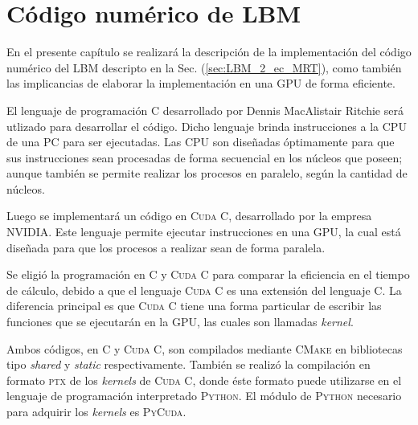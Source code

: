 \chapter{Código numérico de LBM}
\graphicspath{{figs/cap3/}}
\label{cap3}




En el presente capítulo se realizará la descripción de la implementación del código numérico del LBM descripto en la Sec. (\ref{sec:LBM_2_ec_MRT}), como también las implicancias de elaborar la implementación en una GPU de forma eficiente.

El lenguaje de programación \textsc{C} desarrollado por Dennis MacAlistair Ritchie será utlizado para desarrollar el código. Dicho lenguaje brinda instrucciones a la CPU de una PC para ser ejecutadas. Las CPU son diseñadas óptimamente para que sus instrucciones sean procesadas de forma secuencial en los núcleos que poseen; aunque también se permite realizar los procesos en paralelo, según la cantidad de núcleos.

Luego se implementará un código en \textsc{Cuda C}, desarrollado por la empresa NVIDIA. Este lenguaje permite ejecutar instrucciones en una GPU, la cual está diseñada para que los procesos a realizar sean de forma paralela.

Se eligió la programación en \textsc{C} y \textsc{Cuda C} para comparar la eficiencia en el tiempo de cálculo, debido a que el lenguaje \textsc{Cuda C} es una extensión del lenguaje \textsc{C}. La diferencia principal es que \textsc{Cuda C}  tiene una forma particular de escribir las funciones que se ejecutarán en la GPU, las cuales son llamadas \textit{kernel}.

Ambos códigos, en \textsc{C} y \textsc{Cuda C}, son compilados mediante \textsc{CMake} en bibliotecas tipo \textit{shared} y \textit{static} respectivamente. También se realizó la compilación en formato \textsc{ptx} de los \textit{kernels} de \textsc{Cuda C}, donde éste formato puede utilizarse en el lenguaje de programación interpretado \textsc{Python}. El módulo de \textsc{Python} necesario para adquirir los \textit{kernels} es \textsc{PyCuda}.


